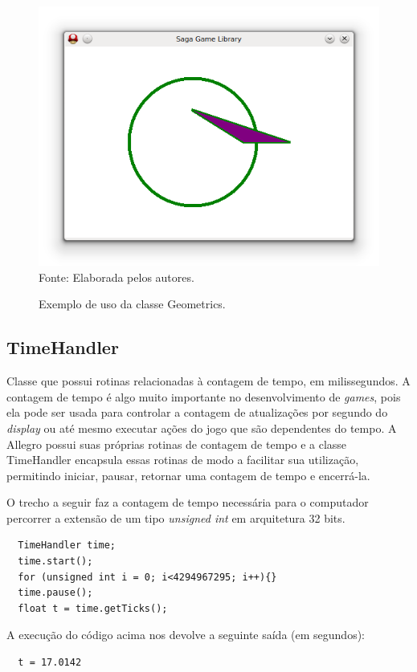 \begin{figure}[H]
    \centering
    \caption{Exemplo de uso da classe Geometrics.}
    \label{ExemploGeometric}
    \includegraphics[scale = 0.7]{Imagens/ExemploGeometric.png}
    \\Fonte: Elaborada pelos autores.
\end{figure}
%
%
\subsection{TimeHandler}
%
%
Classe que possui rotinas relacionadas à contagem de tempo, em milissegundos. A contagem de tempo é algo muito importante no desenvolvimento de \textit{games}, pois ela pode ser usada para controlar a contagem de atualizações por segundo do \textit{display} ou até mesmo executar ações do jogo que são dependentes do tempo. A Allegro possui suas próprias rotinas de contagem de tempo e a classe TimeHandler encapsula essas rotinas de modo a facilitar sua utilização, permitindo iniciar, pausar, retornar uma
contagem de tempo e encerrá-la.
\par
O trecho a seguir faz a contagem de tempo necessária para o computador percorrer a extensão de um tipo \textit{unsigned int} em arquitetura 32 bits.
%
\begin{lstlisting}
  TimeHandler time;
  time.start();
  for (unsigned int i = 0; i<4294967295; i++){} 
  time.pause();
  float t = time.getTicks();
\end{lstlisting}
%
\par 
A execução do código acima nos devolve a seguinte saída (em segundos): 
%
\begin{lstlisting}
  t = 17.0142
\end{lstlisting}
%
